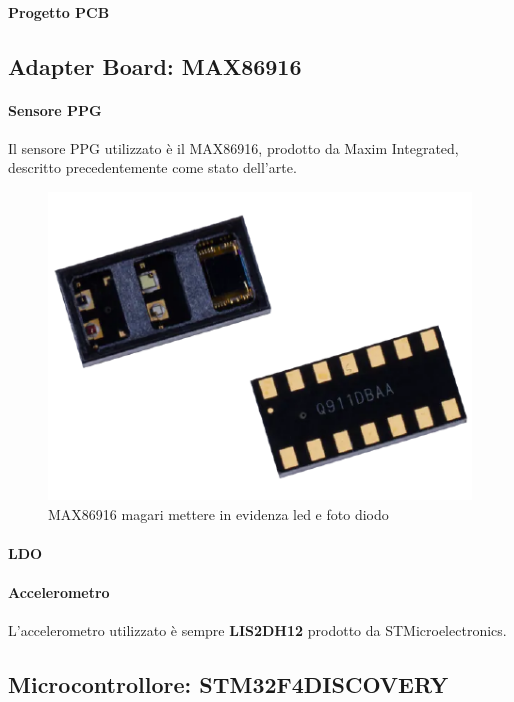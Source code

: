 \paragraph{Progetto PCB}

\subsection{Adapter Board: MAX86916}

\paragraph{Sensore PPG} Il sensore PPG utilizzato è il MAX86916, prodotto da Maxim Integrated, descritto precedentemente come stato dell'arte.

\begin{figure}[tb]
	\centering
	\includegraphics[width=0.6\linewidth]{ImageFiles/Hardware/ImmagineMAX86916}
	\caption{MAX86916 magari mettere in evidenza led e foto diodo}
	\label{fig:ImmagineMAX86916}
\end{figure}

\paragraph{LDO} 

\paragraph{Accelerometro} L'accelerometro utilizzato è sempre \textbf{LIS2DH12} prodotto da STMicroelectronics.

\subsection{Microcontrollore: STM32F4DISCOVERY}
